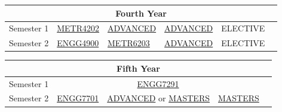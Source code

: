 \documentclass[a4paper,12pt]{report}
\begin{document}
\begin{table}[H]
    \centering
    \begin{tabular}{| m{6em} | m{5em} m{5em} m{5em} m{5em} m{5em} |}
        \hline
        \multicolumn{6}{|c|}{\bfseries Fourth Year} \\
        \hline
        Semester 1 & \hyperlink{METR4202}{METR4202} & \hyperlink{ADVANCED}{ADVANCED} & \hyperlink{ADVANCED}{ADVANCED} & ELECTIVE & \\
        Semester 2 & \hyperlink{ENGG4900}{ENGG4900} & \hyperlink{METR6203}{METR6203} & \hyperlink{ADVANCED}{ADVANCED} & ELECTIVE & \\
        \hline
    \end{tabular}
\end{table}
\begin{table}[H]
    \centering
    \begin{tabular}{| m{6em} | m{5em} m{5em} m{5em} m{5em} m{5em} |}
        \hline
        \multicolumn{6}{|c|}{\bfseries Fifth Year} \\
        \hline
        Semester 1 & \multicolumn{4}{c}{\hyperlink{ENGG7291}{ENGG7291}} & \\
        Semester 2 & \hyperlink{ENGG7701}{ENGG7701} & \multicolumn{2}{c}{\hyperlink{ADVANCED}{ADVANCED} or \hyperlink{MASTERS}{MASTERS}} & \hyperlink{MASTERS}{MASTERS} & \\
        \hline
    \end{tabular}
\end{table}
\renewcommand{\arraystretch}{1}
\newpage
\end{document}

